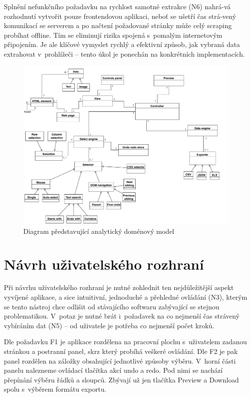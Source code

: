 \documentclass[thesis=B,czech]{FITthesis}[2012/06/26]
\begin{document}
Splnění nefunkčního požadavku na rychlost samotné extrakce (N6) nahrá-vá rozhodnutí vytvořit pouze frontendovou aplikaci, neboť se ušetří čas strá-vený komunikací se serverem a po načtení požadované stránky může celý scraping probíhat offline. Tím se eliminují rizika spojená s~pomalým internetovým připojením. Je ale klíčové vymyslet rychlý a efektivní způsob, jak vybraná data extrahovat v~prohlížeči -- tento úkol je ponechán na konkrétních implementacích.

\begin{figure}
	\includegraphics[width=\linewidth]{images/conceptual_diagram.pdf}
	\caption[Analytický doménový model]{Diagram představující analytický doménový model}
	\label{fig:conceptual_diagram}
\end{figure}

\newpage
\section{Návrh uživatelského rozhraní}
Při návrhu uživatelského rozhraní je nutné zohlednit ten nejdůležitější aspekt vyvíjené aplikace, a sice intuitivní, jednoduché a přehledné ovládání (N3), kterým se tento nástroj chce odlišit od stávajícího softwaru zabývající se stejnou problematikou. V~potaz je nutné brát i~požadavek na co nejmenší čas strávený vybíráním dat (N5) -- od uživatele je potřeba co nejmenší počet kroků.

Dle požadavku F1 je aplikace rozdělena na pracovní plochu s~uživatelem zadanou stránkou a postranní panel, skrz který probíhá veškeré ovládání. Dle F2 je pak panel rozdělen na záložky obsahující jednotlivé způsoby výběru. V~horní části panelu nalezneme ovládací tlačítka akcí undo a redo. Pod nimi se nachází přepínání výběru řádků a sloupců. Zbývají už jen tlačítka \textsf{Preview} a \textsf{Download} spolu s~výběrem formátu exportu.
\end{document}
